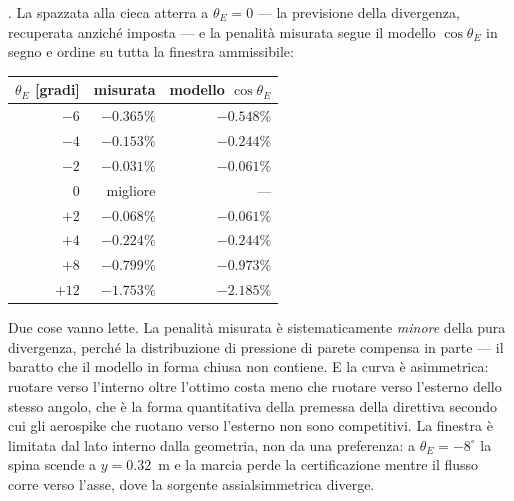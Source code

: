 . La spazzata alla cieca
atterra a $\theta_E = 0$ --- la previsione della divergenza,
recuperata anziché imposta --- e la penalità misurata segue il
modello $\cos\theta_E$ in segno e ordine su tutta la finestra
ammissibile:

\begin{center}
\small
\begin{tabular}{rrr}
\toprule
$\theta_E$ [gradi] & misurata & modello $\cos\theta_E$ \\
\midrule
$-6$ & $-0.365\%$ & $-0.548\%$ \\
$-4$ & $-0.153\%$ & $-0.244\%$ \\
$-2$ & $-0.031\%$ & $-0.061\%$ \\
$0$  & migliore   & --- \\
$+2$ & $-0.068\%$ & $-0.061\%$ \\
$+4$ & $-0.224\%$ & $-0.244\%$ \\
$+8$ & $-0.799\%$ & $-0.973\%$ \\
$+12$& $-1.753\%$ & $-2.185\%$ \\
\bottomrule
\end{tabular}
\end{center}

Due cose vanno lette. La penalità misurata è sistematicamente
\emph{minore} della pura divergenza, perché la distribuzione di
pressione di parete compensa in parte --- il baratto che il modello
in forma chiusa non contiene. E la curva è asimmetrica: ruotare verso
l'interno oltre l'ottimo costa meno che ruotare verso l'esterno dello
stesso angolo, che è la forma quantitativa della premessa della
direttiva secondo cui gli aerospike che ruotano verso l'esterno non
sono competitivi. La finestra è limitata dal lato interno dalla
geometria, non da una preferenza: a $\theta_E = -8^{\circ}$ la spina
scende a $y = 0.32$~m e la marcia perde la certificazione mentre il
flusso corre verso l'asse, dove la sorgente assialsimmetrica diverge.
